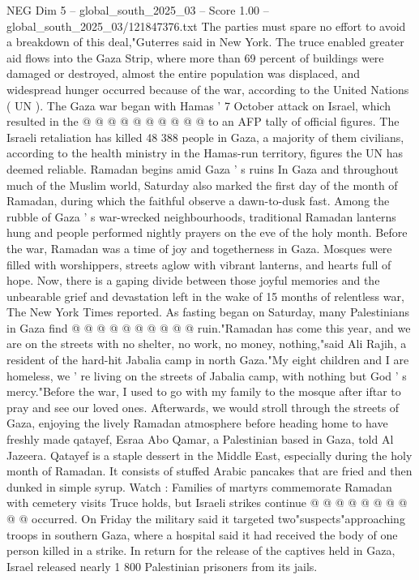 \begin{textsample}{NEG Dim 5 – global\_south\_2025\_03 – Score 1.00 – global\_south\_2025\_03/121847376.txt}
The parties must spare no effort to avoid a breakdown of this deal,"Guterres said in New York.
The truce enabled greater aid flows into the Gaza Strip, where more than 69 percent of buildings were damaged or destroyed, almost the entire population was displaced, and widespread hunger occurred because of the war, according to the United Nations ( UN ).
The Gaza war began with Hamas ' 7 October attack on Israel, which resulted in the @ @ @ @ @ @ @ @ @ @ to an AFP tally of official figures.
The Israeli retaliation has killed 48 388 people in Gaza, a majority of them civilians, according to the health ministry in the Hamas-run territory, figures the UN has deemed reliable.
Ramadan begins amid Gaza ' s ruins In Gaza and throughout much of the Muslim world, Saturday also marked the first day of the month of Ramadan, during which the faithful observe a dawn-to-dusk fast.
Among the rubble of Gaza ' s war-wrecked neighbourhoods, traditional Ramadan lanterns hung and people performed nightly prayers on the eve of the holy month.
Before the war, Ramadan was a time of joy and togetherness in Gaza.
Mosques were filled with worshippers, streets aglow with vibrant lanterns, and hearts full of hope.
Now, there is a gaping divide between those joyful memories and the unbearable grief and devastation left in the wake of 15 months of relentless war, The New York Times reported.
As fasting began on Saturday, many Palestinians in Gaza find @ @ @ @ @ @ @ @ @ @ ruin."Ramadan has come this year, and we are on the streets with no shelter, no work, no money, nothing,"said Ali Rajih, a resident of the hard-hit Jabalia camp in north Gaza."My eight children and I are homeless, we ' re living on the streets of Jabalia camp, with nothing but God ' s mercy."Before the war, I used to go with my family to the mosque after iftar to pray and see our loved ones.
Afterwards, we would stroll through the streets of Gaza, enjoying the lively Ramadan atmosphere before heading home to have freshly made qatayef, Esraa Abo Qamar, a Palestinian based in Gaza, told Al Jazeera.
Qatayef is a staple dessert in the Middle East, especially during the holy month of Ramadan.
It consists of stuffed Arabic pancakes that are fried and then dunked in simple syrup.
Watch : Families of martyrs commemorate Ramadan with cemetery visits Truce holds, but Israeli strikes continue @ @ @ @ @ @ @ @ @ @ occurred.
On Friday the military said it targeted two"suspects"approaching troops in southern Gaza, where a hospital said it had received the body of one person killed in a strike.
In return for the release of the captives held in Gaza, Israel released nearly 1 800 Palestinian prisoners from its jails.

\end{textsample}
